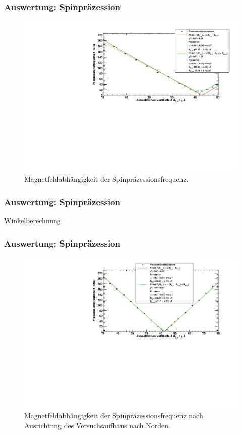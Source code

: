 \begin{frame}
\frametitle{Auswertung: Spinpräzession}

\begin{figure}
    \centering
    \includegraphics[width=\textwidth]{../img/Rb85.pdf}
    \caption{Magnetfeldabhängigkeit der Spinpräzessionsfrequenz.}  
\end{figure} 
  
\end{frame}


\begin{frame}
\frametitle{Auswertung: Spinpräzession}

Winkelberechnung
  
\end{frame}

\begin{frame}
\frametitle{Auswertung: Spinpräzession}

\begin{figure}
    \centering
    \includegraphics[width=\textwidth]{../img/Rb85_gedreht.pdf}
    \caption{Magnetfeldabhängigkeit der Spinpräzessionsfrequenz nach Ausrichtung des Versuchsaufbaus nach Norden.}  
\end{figure} 
  
\end{frame}




